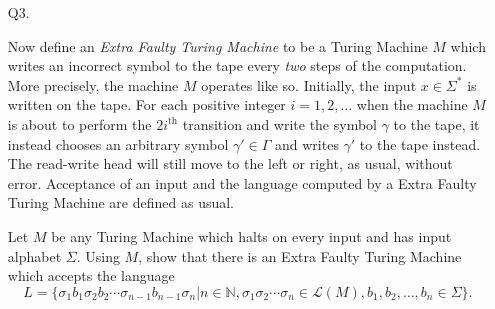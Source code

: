 \documentclass{csc_assignment}
\begin{document}
\begin{description}
\begin{enumerate}



\newpage
\item[Q3.]

Now define an \emph{Extra Faulty Turing Machine} to be a Turing Machine $M$ which writes an incorrect symbol to the tape every \emph{two} steps of the computation.
  More precisely, the machine $M$ operates like so.
  Initially, the input $x \in \Sigma^*$ is written on the tape.
  For each positive integer $i = 1, 2, \ldots$ when the machine $M$ is about to perform the $2i^{\text{th}}$ transition and write the symbol $\gamma$ to the tape, it instead chooses an arbitrary symbol $\gamma' \in \Gamma$ and writes $\gamma'$ to the tape instead.
  The read-write head will still move to the left or right, as usual, without error.
  Acceptance of an input and the language computed by a Extra Faulty Turing Machine are defined as usual.

  Let $M$ be any Turing Machine which halts on every input and has input alphabet $\Sigma$.
  Using $M$, show that there is an Extra Faulty Turing Machine which accepts the language \[ L = \{\sigma_1b_1\sigma_2b_2 \cdots \sigma_{n-1}b_{n-1}\sigma_n | n \in \mathbb{N}, \sigma_1\sigma_2 \cdots \sigma_n \in \mathcal{L}(M), b_1, b_2, \ldots, b_n \in \Sigma\}.\]
  

\end{enumerate}
\end{description}
\end{document}
